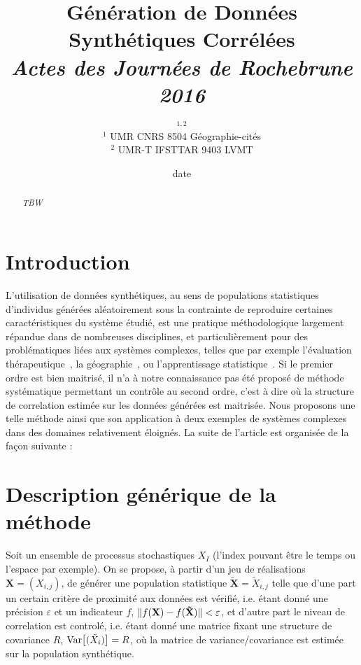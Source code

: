 


\title{Génération de Données Synthétiques Corrélées\\\medskip
\textit{Actes des Journées de Rochebrune 2016}
}
\author{$^{1,2}$\\
$^{1}$ UMR CNRS 8504 Géographie-cités\\
$^{2}$ UMR-T IFSTTAR 9403 LVMT
}
\date{date}


\maketitle

\justify


\begin{abstract}
\textit{TBW}
\end{abstract}



\section{Introduction}

L'utilisation de données synthétiques, au sens de populations statistiques d'individus générées aléatoirement sous la contrainte de reproduire certaines caractéristiques du système étudié, est une pratique méthodologique largement répandue dans de nombreuses disciplines, et particulièrement pour des problématiques liées aux systèmes complexes, telles que par exemple l'évaluation thérapeutique~\cite{abadie2010synthetic}, la géographie~\cite{moeckel2003creating}, ou l'apprentissage statistique~\cite{bolon2013review}. Si le premier ordre est bien maitrisé, il n'a à notre connaissance pas été proposé de méthode systématique permettant un contrôle au second ordre, c'est à dire où la structure de correlation estimée sur les données générées est maitrisée. Nous proposons une telle méthode ainsi que son application à deux exemples de systèmes complexes dans des domaines relativement éloignés. La suite de l'article est organisée de la façon suivante : 


\section{Description générique de la méthode}


Soit un ensemble de processus stochastiques $X_I$ (l'index pouvant être le temps ou l'espace par exemple). On se propose, à partir d'un jeu de réalisations $\mathbf{X}=(X_{i,j})$, de générer une population statistique $\mathbf{\tilde{X}}=\tilde{X}_{i,j}$ telle que d'une part un certain critère de proximité aux données est vérifié, i.e. étant donné une précision $\varepsilon$ et un indicateur $f$, $\| f(\mathbf{X})-f(\mathbf{\tilde{X}}) \| < \varepsilon$, et d'autre part le niveau de correlation est controlé, i.e. étant donné une matrice fixant une structure de covariance $R$, $\operatorname{Var}\!\left[(\tilde{X}_i)\right] = R$, où la matrice de variance/covariance est estimée sur la population synthétique.



